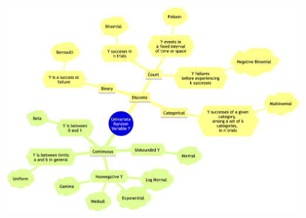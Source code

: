 \documentclass[
  letterpaper,
  DIV=11,
  numbers=noendperiod]{scrreprt}
\begin{document}
\includegraphics[width=11.75in,height=8.3in]{book/C-distributional-cheatsheet_files/figure-latex/mermaid-figure-1.png}
\end{document}
